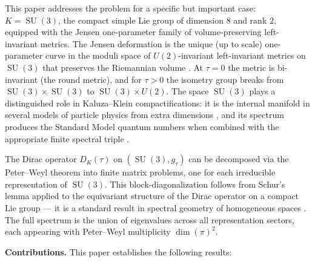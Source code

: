 \documentclass[12pt]{article}
\theoremstyle{definition}
\theoremstyle{remark}
\DeclareMathOperator{\SU}{SU}
\begin{document}
This paper addresses the problem for a specific but important case:
$K = \SU(3)$, the compact simple Lie group of dimension $8$ and
rank $2$, equipped with the Jensen one-parameter family of
volume-preserving left-invariant metrics.  The Jensen deformation is
the unique (up to scale) one-parameter curve in the moduli space of
$U(2)$-invariant left-invariant metrics on $\SU(3)$ that preserves
the Riemannian volume
\cite{Jensen1973, Baptista2024}.  At
$\tau = 0$ the metric is bi-invariant (the round metric), and for
$\tau > 0$ the isometry group breaks from
$\SU(3) \times \SU(3)$ to $\SU(3) \times U(2)$.  The space
$\SU(3)$ plays a distinguished role in Kaluza--Klein
compactifications: it is the internal manifold in several models of
particle physics from extra dimensions
\cite{Baptista2024, Witten1981}, and its spectrum
produces the Standard Model quantum numbers when combined with the
appropriate finite spectral triple
\cite{ChamseddineConnesMarcolli2007}.

The Dirac operator $D_K(\tau)$ on $(\SU(3), g_\tau)$ can be
decomposed via the Peter--Weyl theorem into finite matrix problems,
one for each irreducible representation of $\SU(3)$.  This
block-diagonalization follows from Schur's lemma applied to the
equivariant structure of the Dirac operator on a compact Lie group ---
it is a standard result in spectral geometry of homogeneous spaces
\cite{Fegan1987, Slebarski1985,
  Bar1992}.  The full spectrum is the union of eigenvalues
across all representation sectors, each appearing with Peter--Weyl
multiplicity $\dim(\pi)^2$.

\medskip

\noindent\textbf{Contributions.}  This paper establishes the following
results:
\end{document}
